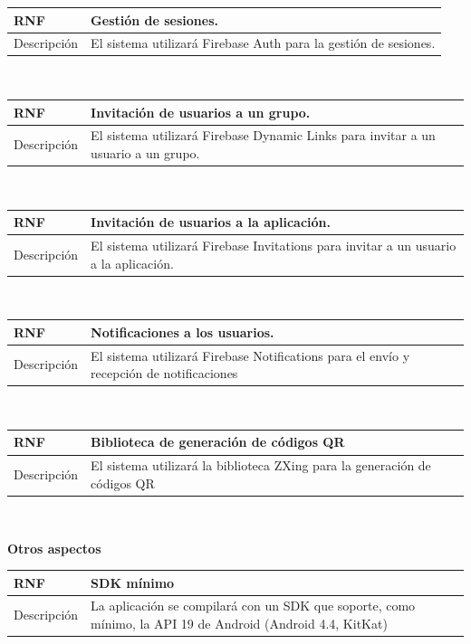 \documentclass[twoside]{report}
\newcommand\addrow[2]{#1 &#2\\ }
\newcommand\addheading[2]{#1 &#2\\ \hline}
\newcommand\tabularhead{\begin{tabular}{lp{0.7\textwidth}}
\hline
}
\newenvironment{req}{\tabularhead}
{\hline\end{tabular}}
\begin{document}
\begin{req}
	\addheading{\textbf{RNF\arabic{nonFunctionalRequirements}}}{Gestión de sesiones.}
	\addrow{Descripción}{El sistema utilizará Firebase Auth para la gestión de sesiones.}
\end{req}\\
	
\begin{req}
	\addheading{\textbf{RNF\arabic{nonFunctionalRequirements}}}{Invitación de usuarios a un grupo.}
	\addrow{Descripción}{El sistema utilizará Firebase Dynamic Links para invitar a un usuario a un grupo.}
\end{req}\\

\begin{req}
	\addheading{\textbf{RNF\arabic{nonFunctionalRequirements}}}{Invitación de usuarios a la aplicación.}
	\addrow{Descripción}{El sistema utilizará Firebase Invitations para invitar a un usuario a la aplicación.}
\end{req}\\

\begin{req}
	\addheading{\textbf{RNF\arabic{nonFunctionalRequirements}}}{Notificaciones a los usuarios.}
	\addrow{Descripción}{El sistema utilizará Firebase Notifications para el envío y recepción de notificaciones}
\end{req}\\

\begin{req}
	\addheading{\textbf{RNF\arabic{nonFunctionalRequirements}}}{Biblioteca de generación de códigos QR}
	\addrow{Descripción}{El sistema utilizará la biblioteca ZXing para la generación de códigos QR}
\end{req}\\


\textbf{Otros aspectos}\\

\begin{req}
	\addheading{\textbf{RNF\arabic{nonFunctionalRequirements}}}{SDK mínimo}
	\addrow{Descripción}{La aplicación se compilará con un SDK que soporte, como mínimo, la API 19 de Android (Android 4.4, KitKat)\cite{androidversiondist}}
\end{req}\\
\end{document}
